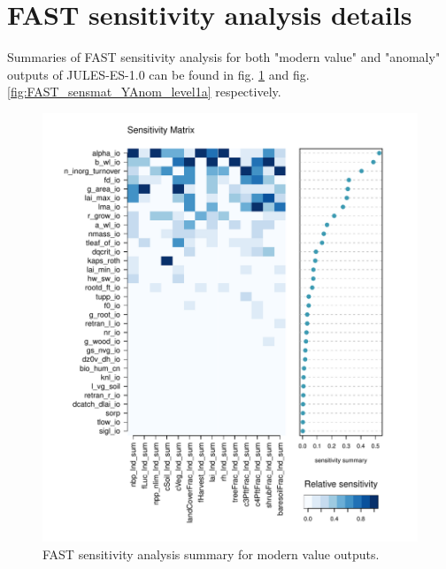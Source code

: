 \documentclass[gmd, manuscript]{copernicus}
\begin{document}
\section{FAST sensitivity analysis details}\label{app:sa_fast}

Summaries of FAST sensitivity analysis for both "modern value" and "anomaly" outputs of JULES-ES-1.0 can be found in fig. \ref{fig:FAST_sensmat_Y_level1a} and fig. \ref{fig:FAST_sensmat_YAnom_level1a} respectively.

\begin{figure}[t]
\includegraphics[width=12cm]{./figs/FAST_sensmat_Y_level1a_wave01.pdf}
\caption{FAST sensitivity analysis summary for modern value outputs.}
\label{fig:FAST_sensmat_Y_level1a}
\end{figure}
\end{document}
